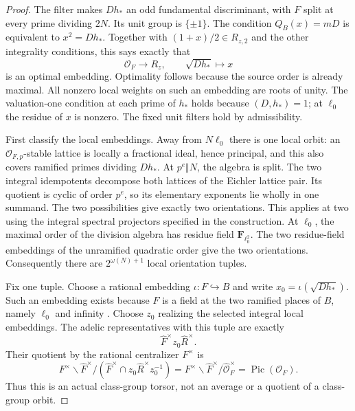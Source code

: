 \documentclass[11pt]{article}
\theoremstyle{definition}
\theoremstyle{remark}
\begin{document}
\begin{proof}
The filter makes $Dh_*$ an odd fundamental discriminant, with
$F$ split at every prime dividing $2N$. Its unit group is
$\{\pm1\}$. The condition $Q_B(x)=mD$ is equivalent to
$x^2=Dh_*$. Together with $(1+x)/2\in R_{z,2}$ and the other
integrality conditions, this says exactly that
\[
 \mathcal O_F\longrightarrow R_z,
 \qquad \sqrt{Dh_*}\longmapsto x
\]
is an optimal embedding. Optimality follows because the source
order is already maximal. All nonzero local weights on such an
embedding are roots of unity. The valuation-one condition at each
prime of $h_*$ holds because $(D,h_*)=1$; at $\ell_0$ the residue
of $x$ is nonzero. The fixed unit filters hold by admissibility.

First classify the local embeddings. Away from $N\ell_0$ there
is one local orbit: an $\mathcal O_{F,p}$-stable lattice is locally
a fractional ideal, hence principal, and this also covers ramified
primes dividing $Dh_*$. At $p^e\Vert N$, the algebra is split.
The two integral idempotents decompose both lattices of the
Eichler lattice pair. Its quotient is cyclic of order $p^e$,
so its elementary exponents lie wholly in one summand. The two
possibilities give exactly two orientations. This applies at two
using the integral spectral projectors specified in the construction.
At $\ell_0$, the maximal order of the division algebra has residue
field $\mathbf F_{\ell_0^2}$. The two residue-field embeddings
of the unramified quadratic order give the two orientations.
Consequently there are $2^{\omega(N)+1}$ local orientation tuples.

Fix one tuple. Choose a rational embedding
$\iota:F\hookrightarrow B$ and write $x_0=\iota(\sqrt{Dh_*})$.
Such an embedding exists because $F$ is a field at the two ramified
places of $B$, namely $\ell_0$ and infinity
\cite[Proposition 14.6.7, $(v)\Rightarrow(iii)$]{voight-quaternion}.
Choose $z_0$ realizing
the selected integral local embeddings. The adelic representatives
with this tuple are exactly
\[
       \widehat F^{\times}z_0\widehat R^{\times}.
\]
Their quotient by the rational centralizer $F^{\times}$ is
\[
 F^{\times}\backslash\widehat F^{\times}/
      (\widehat F^{\times}\cap z_0\widehat R^{\times}z_0^{-1})
 =F^{\times}\backslash\widehat F^{\times}/\widehat{\mathcal O}_F^{\times}
 =\operatorname{Pic}(\mathcal O_F).
\]
Thus this is an actual class-group torsor, not an average or a
quotient of a class-group orbit.


\end{proof}
\end{document}
